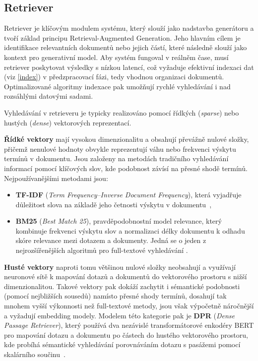 
\subsection{Retriever}
Retriever je klíčovým modulem systému, který slouží jako nadstavba generátoru a tvoří základ principu Retrieval-Augmented Generation. Jeho hlavním cílem je identifikace relevantních dokumentů nebo jejich částí, které následně slouží jako kontext pro generativní model. Aby systém fungoval v reálněm čase, musí retriever poskytovat výsledky s nízkou latencí, což vyžaduje efektivní indexaci dat (viz \ref{index}) v předzpracovací fázi, tedy vhodnou organizaci dokumentů. Optimalizované algoritmy indexace pak umožňují rychlé vyhledávání i nad rozsáhlými datovými sadami.

Vyhledávání v retrieveru je typicky realizováno pomocí řídkých (\textit{sparse}) nebo hustých (\textit{dense}) vektorových reprezentací. \newpage

\textbf{Řídké vektory} mají vysokou dimenzionalitu a obsahují převážně nulové složky, přičemž nenulové hodnoty obvykle reprezentují váhu nebo frekvenci výskytu termínů v dokumentu. Jsou založeny na metodách tradičního vyhledávání informací pomocí klíčových slov, kde podobnost závísí na přesné shodě termínů. Nejpoužívanějšími metodami jsou:
\begin{itemize}
    \item \textbf{TF-IDF} (\textit{Term Frequency–Inverse Document Frequency}), která vyjadřuje důležitost slova na základě jeho četnosti výskytu v dokumentu~\cite{buttcher2010information},
    \item \textbf{BM25} (\textit{Best Match 25}), pravděpodobnostní model relevance, který kombinuje frekvenci výskytu slov a normalizaci délky dokumentu k odhadu skóre relevance mezi dotazem a dokumenty. Jedná se o jeden z nejrozšířenějších algoritmů pro full-textové vyhledávání \cite{robertson2009bm25}.
\end{itemize}

\textbf{Husté vektory} naproti tomu většinou nulové složky neobsahují a využívají neuronové sítě k mapování dotazů a dokumentů do vektorového prostoru s nižší dimenzionalitou. Takové vektory pak dokáží zachytit i sémantické podobnosti (pomocí nejbližších sousedů) namísto přesné shody termínů, dosahují tak mnohem vyšší výkonnosti než full-textové metody, jsou však výpočetně náročnější a vyžadují embedding modely. Modelem této kategorie pak je \textbf{DPR} (\textit{Dense Passage Retriever}), který používá dva nezávislé transformátorové enkodéry BERT pro mapování dotazu a dokumentu po částech do hustého vektorového prostoru, kde probíhá sémantické vyhledávání porovnáváním dotazu s pasážemi pomocí skalárního součinu~\cite{karpukhin2020dense}.

